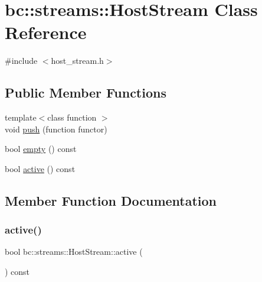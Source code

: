 \hypertarget{classbc_1_1streams_1_1HostStream}{}\section{bc\+:\+:streams\+:\+:Host\+Stream Class Reference}
\label{classbc_1_1streams_1_1HostStream}


{\ttfamily \#include $<$host\+\_\+stream.\+h$>$}

\subsection*{Public Member Functions}
\begin{DoxyCompactItemize}
\item 
{\footnotesize template$<$class function $>$ }\\void \hyperlink{classbc_1_1streams_1_1HostStream_a719b8268cb8171b6800a36eda3b8e511}{push} (function functor)
\item 
bool \hyperlink{classbc_1_1streams_1_1HostStream_ad57d2b514e8a2208a42b801da9865806}{empty} () const
\item 
bool \hyperlink{classbc_1_1streams_1_1HostStream_a7276c60b3a20e5e6811d58003f738a45}{active} () const
\end{DoxyCompactItemize}


\subsection{Member Function Documentation}
\mbox{\label{classbc_1_1streams_1_1HostStream_a7276c60b3a20e5e6811d58003f738a45}} 
\subsubsection{\texorpdfstring{active()}{active()}}
{\footnotesize\ttfamily bool bc\+::streams\+::\+Host\+Stream\+::active (\begin{DoxyParamCaption}{ }\end{DoxyParamCaption}) const\hspace{0.3cm}{\ttfamily [inline]}}

\mbox{\label{classbc_1_1streams_1_1HostStream_ad57d2b514e8a2208a42b801da9865806}} 
